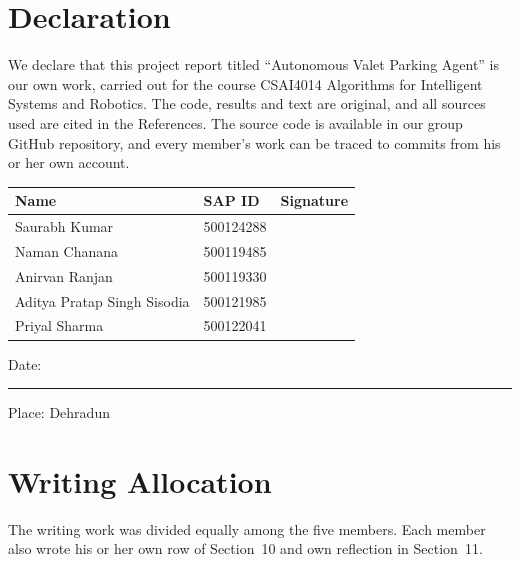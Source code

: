 \documentclass[12pt,a4paper]{article}
\begin{document}
\section*{Declaration}
We declare that this project report titled ``Autonomous Valet Parking Agent'' is our own work, carried out for the course CSAI4014 Algorithms for Intelligent Systems and Robotics. The code, results and text are original, and all sources used are cited in the References. The source code is available in our group GitHub repository, and every member's work can be traced to commits from his or her own account.

\vspace{1cm}
\renewcommand{\arraystretch}{2.2}
\begin{tabular}{|P{5.2cm}|P{3cm}|P{4.5cm}|}
\hline
\textbf{Name} & \textbf{SAP ID} & \textbf{Signature} \\ \hline
Saurabh Kumar & 500124288 & \\ \hline
Naman Chanana & 500119485 & \\ \hline
Anirvan Ranjan & 500119330 & \\ \hline
Aditya Pratap Singh Sisodia & 500121985 & \\ \hline
Priyal Sharma & 500122041 & \\ \hline
\end{tabular}
\renewcommand{\arraystretch}{1.2}

\vspace{0.8cm}
Date: \rule{4cm}{0.4pt} \hfill Place: Dehradun
\newpage

{\singlespacing\setlength{\cftbeforesecskip}{4pt}\tableofcontents}
\newpage
{\singlespacing\setlength{\cftbeforefigskip}{3pt}\setlength{\cftbeforetabskip}{3pt}
\listoffigures
{}
\listoftables
{}}
\newpage

\section*{Writing Allocation}
The writing work was divided equally among the five members. Each member also wrote his or her own row of Section~10 and own reflection in Section~11.
\end{document}
